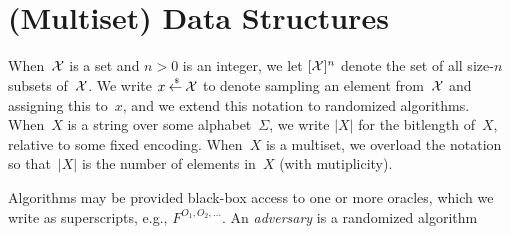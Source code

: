 \section{(Multiset) Data Structures}

 When~${\cal X}$ is a set and $n>0$ is an
integer, we let $[{\cal X}]^n$ denote the set of all size-$n$ subsets
 of~${\cal X}$. We write $x {\:\stackrel{{\scriptscriptstyle \hspace{0.2em}\$}} {\leftarrow}\:} {\cal X}$ to denote
sampling an element from~${\cal X}$ and assigning this to~$x$, and we
extend this notation to randomized algorithms.  When~$X$ is a string
over some alphabet~$\Sigma$, we write $|X|$ for the bitlength
of~$X$, relative to some fixed encoding.  When~$X$ is a multiset, we
overload the notation so that~$|X|$ is the number of elements in~$X$
(with mutiplicity).

Algorithms may be provided black-box access to one or more oracles, which we write as superscripts, e.g., $F^{O_1,O_2,\ldots}$.  An \emph{adversary} is a randomized algorithm

